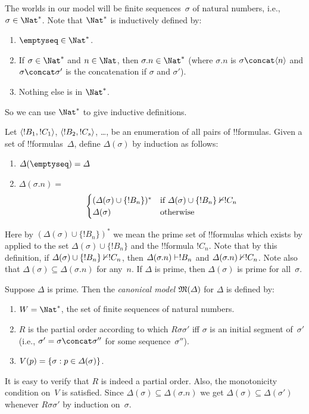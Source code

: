 \documentclass[../../../include/open-logic-section]{subfiles}
\begin{document}


The worlds in our model will be finite sequences~$\sigma$ of natural
numbers, i.e., $\sigma \in \Nat^*$. Note that $\Nat^*$ is inductively
defined by:
\begin{enumerate}
\item $\emptyseq \in \Nat^*$.
\item If $\sigma \in \Nat^*$ and $n \in \Nat$, then $\sigma.n \in
  \Nat^*$ (where $\sigma.n$ is $\sigma \concat \tuple{n}$ and $\sigma \concat \sigma'$ is the concatenation if $\sigma$ and $\sigma'$).
\item Nothing else is in $\Nat^*$.
\end{enumerate}
So we can use $\Nat^*$ to give inductive definitions.

Let $\langle !B_1, !C_1 \rangle$, $\langle !B_2, !C_s \rangle$, \dots, be an
enumeration of all pairs of !!{formula}s. Given a set of
!!{formula}s~$\Delta$, define $\Delta(\sigma)$ by induction as
follows:
\begin{enumerate}
\item $\Delta(\emptyseq) = \Delta$
\item $\Delta(\sigma.n) = {}$
  \[
  \begin{cases}
    (\Delta(\sigma) \cup \{!B_n\})^* &
    \text{if $\Delta(\sigma) \cup \{!B_n\} \Proves/ !C_n$} \\
    \Delta(\sigma) & \text{otherwise}
  \end{cases}
  \]
\end{enumerate}
Here by $(\Delta(\sigma) \cup \{!B_n\})^*$ we mean the prime set of
!!{formula}s which exists by  applied to the
set $\Delta(\sigma) \cup \{!B_n\}$ and the !!{formula} $!C_n$. Note that by this definition, if
$\Delta(\sigma) \cup \{!B_n\} \Proves/ !C_n$, then $\Delta(\sigma.n)
\Proves !B_n$ and $\Delta(\sigma.n) \Proves/ !C_n$.  Note also that
$\Delta(\sigma) \subseteq \Delta(\sigma.n)$ for any~$n$. If $\Delta$
is prime, then $\Delta(\sigma)$ is prime for all~$\sigma$.

\begin{defn}
  Suppose $\Delta$ is prime.  Then the \emph{canonical model} $\mModel{M(\Delta)}$ for
  $\Delta$ is defined by:
  \begin{enumerate}
  \item $W = \Nat^*$, the set of finite sequences of natural numbers.
  \item $R$ is the partial order according to which $R\sigma\sigma'$
    iff $\sigma$ is an initial segment of~$\sigma'$ (i.e., $\sigma' =
    \sigma \concat \sigma''$ for some sequence~$\sigma''$).
  \item $V(p) = \{ \sigma : p \in \Delta(\sigma) \}$.
  \end{enumerate}
\end{defn}

It is easy to verify that $R$ is indeed a partial order. Also, the
monotonicity condition on~$V$ is satisfied.  Since $\Delta(\sigma)
\subseteq \Delta(\sigma.n)$ we get $\Delta(\sigma)
\subseteq \Delta(\sigma')$ whenever $R\sigma\sigma'$ by induction
on~$\sigma$.
\end{document}
